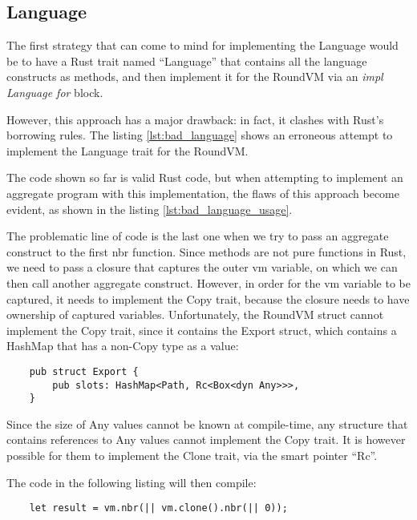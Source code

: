\subsection{Language}
The first strategy that can come to mind for implementing the Language would be to have a Rust trait named ``Language'' that contains all the language constructs as methods, and then implement
it for the RoundVM via an \textit{impl Language for} block.

However, this approach has a major drawback: in fact, it clashes with Rust's borrowing rules.
The listing \ref{lst:bad_language} shows an erroneous attempt to implement the Language trait for the RoundVM.



The code shown so far is valid Rust code, but when attempting to implement an aggregate program with this implementation, the flaws of this approach become evident, as
shown in the listing \ref{lst:bad_language_usage}.



The problematic line of code is the last one when we try to pass an aggregate construct to the first nbr function. Since methods are not pure functions in Rust,
we need to pass a closure that captures the outer vm variable, on which we can then call another aggregate construct. However, in order for the vm variable to be
captured, it needs to implement the Copy trait, because the closure needs to have ownership of captured variables. Unfortunately, the RoundVM struct cannot implement the
Copy trait, since it contains the Export struct, which contains a HashMap that has a non-Copy type as a value:

\begin{lstlisting}
    pub struct Export {
        pub slots: HashMap<Path, Rc<Box<dyn Any>>>,
    }
\end{lstlisting}

Since the size of Any values cannot be known at compile-time, any structure that contains references to Any values cannot implement the Copy trait.
It is however possible for them to implement the Clone trait, via the smart pointer ``Rc''.

The code in the following listing will then compile:

\begin{lstlisting}
    let result = vm.nbr(|| vm.clone().nbr(|| 0));
\end{lstlisting}

